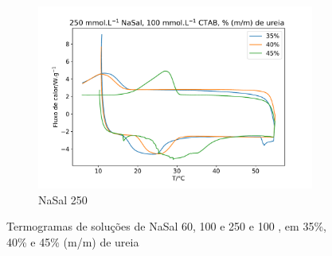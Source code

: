 \begin{figure}
	\hspace{4cm} \begin{subfigure}{0.5\textwidth}
		\centering
		\includegraphics[width=\textwidth]{./imagens/dsc/NaSal250}
		\caption{NaSal 250\mM}
		\label{fig:DSC_NaSal250}
	\end{subfigure}

	\caption{Termogramas de soluções de NaSal 60, 100 e 250 \mM{} e \CTAB{} 100 \mM{}, em 35\%, 40\% e 45\% (m/m) de ureia}
	\label{fig:DSC_NaSals}

\end{figure}

%	
%	
%

		
	

